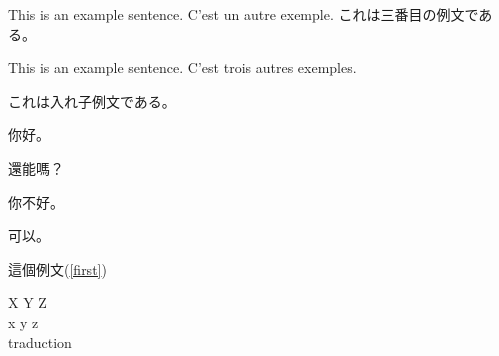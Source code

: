 \documentclass{article}
\begin{document}
\begin{exe}
  \ex This is an example sentence.
  \ex C'est un autre exemple.
  \ex これは三番目の例文である。
\end{exe}

\begin{exe}
  \ex\label{first} This is an example sentence. %
  \ex C'est trois autres exemples.
    \begin{xlist} %
      \ex これは入れ子例文である。
        \begin{xlist} %
          \ex 你好。
            \begin{xlistI} %
              \ex 還能嗎？
            \end{xlistI}
          \ex 你不好。
            \begin{xlistA} %
              \ex 可以。
            \end{xlistA}
        \end{xlist}  
    \end{xlist}
\end{exe}
這個例文(\ref{first}) %

\newpage

\begin{exe}
  \gll X Y Z\\ %
  x y z\\ %
  \glt traduction %
\end{exe}
\end{document}
